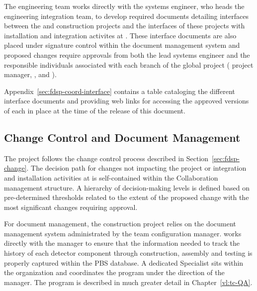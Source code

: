 The  engineering team works directly with the
 systems engineer, who heads the  
engineering integration team, to develop required documents 
detailing interfaces between the  and  
 construction projects and the interfaces of these 
projects with  installation and integration
activites at .  These  interface 
documents are also placed under signature control within the 
 document management system and proposed 
changes require approvals from both the lead  
systems engineer and the responsible individuals associated 
with each branch of the global project ( project 
manager,  , and ).

Appendix~\ref{sec:fdsp-coord-interface} contains a table 
cataloging the different  interface documents 
and providing web links for accessing the approved versions 
of each in place at the time of the release of this document.
 
\subsection{Change Control and Document Management}
\label{sec:tc_change control}

The  project follows the  change 
control process described in Section~\ref{sec:fdsp-change}.  
The decision path for changes not impacting the  
project or  integration and installation 
activities at  is self-contained within the 
 Collaboration management structure.  A hierarchy 
of decision-making levels is defined based on pre-determined 
thresholds related to the extent of the proposed change 
with the most significant changes requiring  
 approval.

For document management, the  construction project 
relies on the  document management system 
administrated by the  team configuration manager.  
 works directly with the   
manager to ensure that the information needed to track the 
history of each detector component through construction, 
assembly and testing is properly captured within the PBS 
database.  A dedicated   Specialist 
sits within the  organization and coordinates the 
  program under the direction of the
  manager.  The  
 program is described in much greater detail in 
Chapter~\ref{vl:tc-QA}.
 
